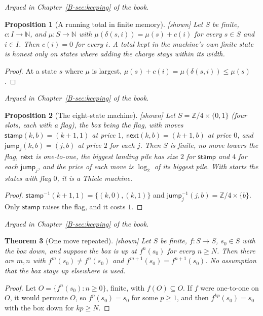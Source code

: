\documentclass[11pt, a4paper]{article}
\theoremstyle{plain}
\newtheorem{theorem}{Theorem}[section]
\newtheorem{proposition}[theorem]{Proposition}
\theoremstyle{definition}
\theoremstyle{remark}
\newcommand{\N}{\mathbb{N}}
\newcommand{\Z}{\mathbb{Z}}
\newcommand{\step}{\delta}
\newcommand{\cost}{c}
\newcommand{\inv}{^{-1}}
\newcommand{\argued}[1]{\par\noindent\textit{Argued in Chapter~\ref{B-#1} of the book.}\par}
\newcommand{\kind}[1]{\textup{[#1]}}
\begin{document}
\argued{sec:keeping}

\begin{proposition}[A running total in finite memory]\label{spec:finite-counter} \kind{shown}
Let $S$ be finite, $\cost:I\to\N$, and $\mu:S\to\N$ with $\mu(\step(s,i))=\mu(s)+\cost(i)$ for every $s\in S$
and $i\in I$. Then $\cost(i)=0$ for every $i$. A total kept in the machine's own finite state is honest only on
states where adding the charge stays within its width.
\end{proposition}

\begin{proof}
At a state $s$ where $\mu$ is largest, $\mu(s)+\cost(i)=\mu(\step(s,i))\le\mu(s)$.
\end{proof}

\argued{sec:keeping}

\begin{proposition}[The eight-state machine]\label{spec:eight-state} \kind{shown}
Let $S=\Z/4\times\{0,1\}$ (four slots, each with a flag), the box being the flag, with moves
$\mathsf{stamp}(k,b)=(k+1,1)$ at price $1$, $\mathsf{next}(k,b)=(k+1,b)$ at price $0$, and
$\mathsf{jump}_j(k,b)=(j,b)$ at price $2$ for each $j$. Then $S$ is finite, no move lowers the flag,
$\mathsf{next}$ is one-to-one, the biggest landing pile has size $2$ for $\mathsf{stamp}$ and $4$ for each
$\mathsf{jump}_j$, and the price of each move is $\log_2$ of its biggest pile. With starts the states with
flag $0$, it is a Thiele machine.
\end{proposition}

\begin{proof}
$\mathsf{stamp}\inv(k+1,1)=\{(k,0),(k,1)\}$ and $\mathsf{jump}_j\inv(j,b)=\Z/4\times\{b\}$. Only
$\mathsf{stamp}$ raises the flag, and it costs $1$.
\end{proof}

\argued{sec:keeping}

\begin{theorem}[One move repeated]\label{spec:repeat} \kind{shown}
Let $S$ be finite, $f:S\to S$, $s_0\in S$ with the box down, and suppose the box is up at $f^n(s_0)$ for every
$n\ge N$. Then there are $m,n$ with $f^m(s_0)\ne f^n(s_0)$ and $f^{m+1}(s_0)=f^{n+1}(s_0)$. No assumption that
the box stays up elsewhere is used.
\end{theorem}

\begin{proof}
Let $O=\{f^n(s_0):n\ge0\}$, finite, with $f(O)\subseteq O$. If $f$ were one-to-one on $O$, it would permute $O$,
so $f^p(s_0)=s_0$ for some $p\ge1$, and then $f^{kp}(s_0)=s_0$ with the box down for $kp\ge N$.
\end{proof}
\end{document}
